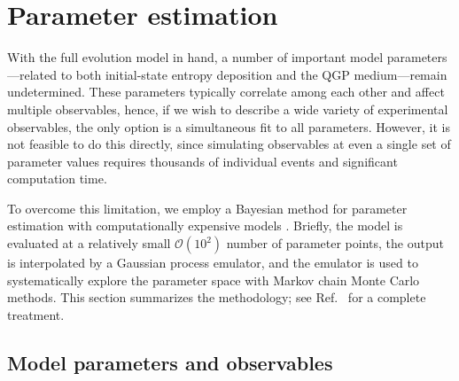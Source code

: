 \documentclass[aps,prc,reprint,amsmath,nofootinbib]{revtex4-1}
\newcommand{\order}[1]{$\mathcal O(10^{#1})$}
\begin{document}
\section{Parameter estimation}

With the full evolution model in hand, a number of important model parameters---related to both initial-state entropy deposition and the QGP medium---remain undetermined.
These parameters typically correlate among each other and affect multiple observables, hence, if we wish to describe a wide variety of experimental observables, the only option is a simultaneous fit to all parameters.
However, it is not feasible to do this directly, since simulating observables at even a single set of parameter values requires thousands of individual events and significant computation time.

To overcome this limitation, we employ a Bayesian method for parameter estimation with computationally expensive models \cite{OHagan:2006ba,Higdon:2008cmc,Higdon:2014tva,Wesolowski:2015fqa}.
Briefly, the model is evaluated at a relatively small \order 2 number of parameter points, the output is interpolated by a Gaussian process emulator, and the emulator is used to systematically explore the parameter space with Markov chain Monte Carlo methods.
This section summarizes the methodology; see Ref.~\cite{Bernhard:2015hxa} for a complete treatment.

\subsection{Model parameters and observables}
\end{document}
